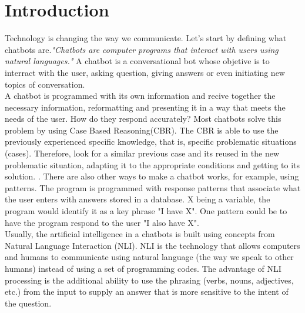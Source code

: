 \documentclass[12pt,twoside]{article}
\theoremstyle{plain}
\theoremstyle{definition}
\theoremstyle{remark}
\begin{document}

\setcounter{tocdepth}{2} 					%
\tableofcontents

\clearpage



\section{Introduction}
\label{sec:introduction}

Technology is changing the way we communicate. Let's start by defining what chatbots are.\textit{"Chatbots are computer programs that interact with users using natural languages."} \cite{shawar2007chatbots}
A chatbot is a conversational bot whose objetive is to interract with the user, asking question, giving answers or even initiating new topics of conversation. \cite{huang2007extracting}\\

A chatbot is programmed with its own information and recive together the necessary information, reformatting and presenting it in a way that meets the needs of the user. How do they respond accurately? Most chatbots solve this problem by using Case Based Reasoning(CBR). The CBR is able to use the previously experienced specific knowledge, that is, specific problematic situations (cases). Therefore, look for a similar previous case and its reused in the new problematic situation, adapting it to the appropriate conditions and getting to its solution. \cite{kolodner2014case}. There are also other ways to make a chatbot works, for example, using patterns. The program is programmed with response patterns that associate what the user enters with answers stored in a database. X being a variable, the program would identify it as a key phrase "I have X". One pattern could be to have the program respond to the user "I also have X". \\


 Usually, the artificial intelligence in a chatbots is built using concepts from Natural Language Interaction (NLI). NLI is the technology that allows computers and humans to communicate using natural language (the way we speak to other humans) instead of using a set of programming codes. The advantage of NLI processing is the additional ability to use the phrasing (verbs, nouns, adjectives, etc.) from the input to supply an answer that is more sensitive to the intent of the question. 
 
\end{document}
